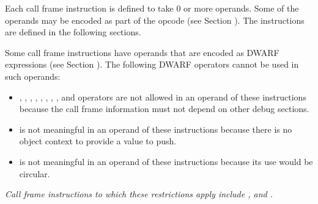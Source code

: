 Each call frame instruction is defined to take 0 or more
operands. Some of the operands may be encoded as part of the
opcode 
(see Section ). 
The instructions are defined in
the following sections.

Some call frame instructions have operands that are encoded
as DWARF expressions 
(see Section ). 
The following DWARF
operators cannot be used in such operands:


\begin{itemize}
\item
\DWOPaddrx, \DWOPcalltwo, \DWOPcallfour{}, \DWOPcallref, 
\DWOPconsttype, \DWOPconstx, \DWOPconvert, \DWOPdereftype, 
\DWOPregvaltype{} and \DWOPreinterpret{}
operators are 
not allowed in an operand of these instructions because
the call frame information must not depend on other
debug sections.

\item \DWOPpushobjectaddress{} is not meaningful in an operand
of these instructions because there is no object context to
provide a value to push.

\item \DWOPcallframecfa{} is not meaningful in an operand of
these instructions because its use would be circular.
\end{itemize}

\textit{Call frame instructions to which these restrictions apply
include \DWCFAdefcfaexpression, \DWCFAexpression{}
and \DWCFAvalexpression.}

